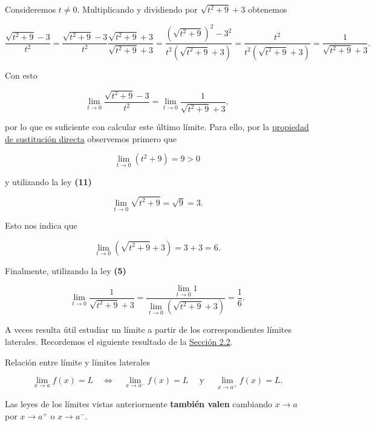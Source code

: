 \documentclass[
  letterpaper,
]{book}
\theoremstyle{plain}
\theoremstyle{remark}
\begin{document}
\begin{tcolorbox}[enhanced jigsaw, opacityback=0, left=2mm, opacitybacktitle=0.6, toprule=.15mm, bottomrule=.15mm, colbacktitle=quarto-callout-tip-color!10!white, titlerule=0mm, bottomtitle=1mm, title=\textcolor{quarto-callout-tip-color}{\faLightbulb}\hspace{0.5em}{Solución}, toptitle=1mm, colframe=quarto-callout-tip-color-frame, colback=white, breakable, rightrule=.15mm, arc=.35mm, leftrule=.75mm, coltitle=black]

Consideremos \(t\neq 0\). Multiplicando y dividiendo por
\(\sqrt{t^2+9}+3\) obtenemos

\[
\frac{\sqrt{t^2+9}-3}{t^2}=\frac{\sqrt{t^2+9}-3}{t^2}\frac{\sqrt{t^2+9}+3}{\sqrt{t^2+9}+3}=\frac{\left(\sqrt{t^2+9}\right)^2-3^2}{t^2(\sqrt{t^2+9}+3)}=\frac{t^2}{t^2(\sqrt{t^2+9}+3)}=\frac{1}{\sqrt{t^2+9}+3}.
\]

Con esto

\[
\lim_{t\to 0} \frac{\sqrt{t^2+9}-3}{t^2} =\lim_{t\to 0} \frac{1}{\sqrt{t^2+9}+3},
\]

por lo que es suficiente con calcular este último límite. Para ello, por
la \hyperref[teo-sust-directa]{propiedad de sustitución directa}
observemos primero que

\[
\lim_{t\to 0} (t^2+9)=9>0
\]

y utilizando la ley \textbf{(11)}

\[
\lim_{t\to 0} \sqrt{t^2+9}=\sqrt{9}=3.
\]

Esto nos indica que

\[
\lim_{t\to 0} \left(\sqrt{t^2+9}+3\right)=3+3=6.
\]

Finalmente, utilizando la ley \textbf{(5)}

\[
\lim_{t\to 0} \frac{1}{\sqrt{t^2+9}+3}=\frac{\lim_{t\to 0} 1}{\lim_{t\to 0}\left(\sqrt{t^2+9}+3\right)}=\frac{1}{6}.
\]

\end{tcolorbox}

A veces resulta útil estudiar un límite a partir de los correspondientes
límites laterales. Recordemos el siguiente resultado de la
\hyperref[seccion_2.2]{Sección 2.2}.

Relación entre límite y límites laterales

\[
\lim_{x\to a} f(x) = L \quad \Longleftrightarrow \quad \lim_{x\to a^-} f(x) = L\quad \text{ y } \quad  \lim_{x\to a^+} f(x) = L.
\]

Las leyes de los límites vistas anteriormente \textbf{también valen}
cambiando \(x\to a\) por \(x\to a^+\) o \(x\to a^-\).
\end{document}
